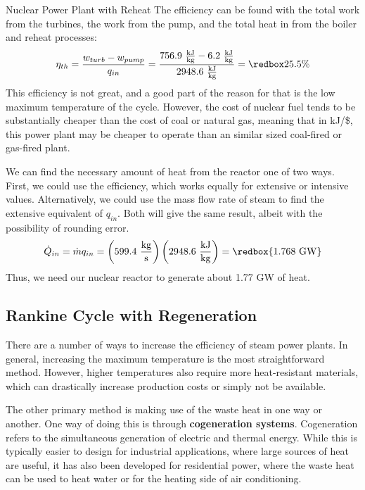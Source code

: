 \begin{example}[label=ex:RankineReheat]{Nuclear Power Plant with Reheat}
  The efficiency can be found with the total work from the turbines, the work from the pump, and the total heat in from the boiler and reheat processes:
  \begin{equation*}
    \eta_{th} = \frac{w_{turb} - w_{pump}}{q_{in}} = \frac{756.9\ \frac{\rm kJ}{\rm kg} - 6.2\ \frac{\rm kJ}{\rm kg}}{2948.6\ \frac{\rm kJ}{\rm kg}} = \redbox{25.5\%}
  \end{equation*}
  This efficiency is not great, and a good part of the reason for that is the low maximum temperature of the cycle.  However, the cost of nuclear fuel tends to be substantially cheaper than the cost of coal or natural gas, meaning that in kJ/\$, this power plant may be cheaper to operate than an similar sized coal-fired or gas-fired plant.

  We can find the necessary amount of heat from the reactor one of two ways.  First, we could use the efficiency, which works equally for extensive or intensive values.  Alternatively, we could use the mass flow rate of steam to find the extensive equivalent of $q_{in}$.  Both will give the same result, albeit with the possibility of rounding error.
  \begin{equation*}
    \dot{Q}_{in} = \dot{m} q_{in} = \left(599.4\ \frac{\rm kg}{\rm s}\right) \left(2948.6\ \frac{\rm kJ}{\rm kg}\right) = \redbox{1.768\ {\rm GW}}
  \end{equation*}
  Thus, we need our nuclear reactor to generate about 1.77 GW of heat.
\end{example}


\subsection{Rankine Cycle with Regeneration} \label{sec:ch4_regen}

There are a number of ways to increase the efficiency of steam power plants.  In general, increasing the maximum temperature is the most straightforward method.  However, higher temperatures also require more heat-resistant materials, which can drastically increase production costs or simply not be available.

The other primary method is making use of the waste heat in one way or another.  One way of doing this is through {\bf cogeneration systems}.  Cogeneration refers to the simultaneous generation of electric and thermal energy.  While this is typically easier to design for industrial applications, where large sources of heat are useful, it has also been developed for residential power, where the waste heat can be used to heat water or for the heating side of air conditioning.

